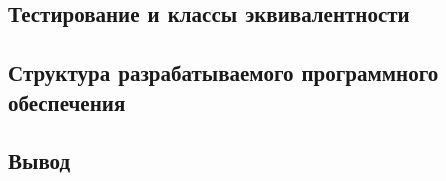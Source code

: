 \subsection{Тестирование и классы эквивалентности}

\subsection{Структура разрабатываемого программного обеспечения}

\subsection*{Вывод}

%
